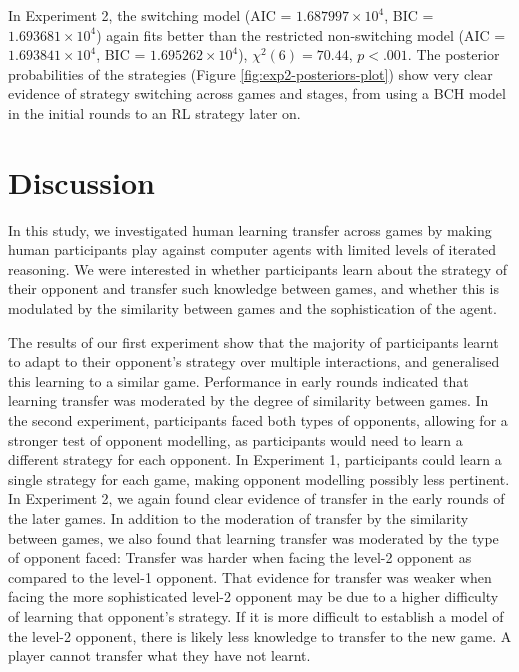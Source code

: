 \documentclass[smallextended]{svjour3}       %
\begin{document}
In Experiment 2, the switching model (AIC =
\ensuremath{1.687997\times 10^{4}}, BIC =
\ensuremath{1.693681\times 10^{4}}) again fits better than the
restricted non-switching model (AIC =
\ensuremath{1.693841\times 10^{4}}, BIC =
\ensuremath{1.695262\times 10^{4}}), \(\chi^2(6) = 70.44\),
\(p < .001\). The posterior probabilities of the strategies (Figure
\ref{fig:exp2-posteriors-plot}) show very clear evidence of strategy
switching across games and stages, from using a BCH model in the initial
rounds to an RL strategy later on.

\hypertarget{discussion-1}{%
\section{Discussion}\label{discussion-1}}

In this study, we investigated human learning transfer across games by
making human participants play against computer agents with limited
levels of iterated reasoning. We were interested in whether participants
learn about the strategy of their opponent and transfer such knowledge
between games, and whether this is modulated by the similarity between
games and the sophistication of the agent.

The results of our first experiment show that the majority of
participants learnt to adapt to their opponent's strategy over multiple
interactions, and generalised this learning to a similar game.
Performance in early rounds indicated that learning transfer was
moderated by the degree of similarity between games. In the second
experiment, participants faced both types of opponents, allowing for a
stronger test of opponent modelling, as participants would need to learn
a different strategy for each opponent. In Experiment 1, participants
could learn a single strategy for each game, making opponent modelling
possibly less pertinent. In Experiment 2, we again found clear evidence
of transfer in the early rounds of the later games. In addition to the
moderation of transfer by the similarity between games, we also found
that learning transfer was moderated by the type of opponent faced:
Transfer was harder when facing the level-2 opponent as compared to the
level-1 opponent. That evidence for transfer was weaker when facing the
more sophisticated level-2 opponent may be due to a higher difficulty of
learning that opponent's strategy. If it is more difficult to establish
a model of the level-2 opponent, there is likely less knowledge to
transfer to the new game. A player cannot transfer what they have not
learnt.
\end{document}

